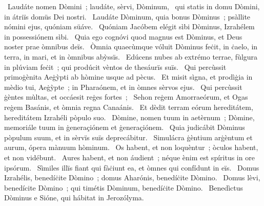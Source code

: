 \psalmChapterWithInscription{}
{ }
{%
~Laudáte nomen Dòmini~; laudáte, sèrvi, Dòminum, 
~qui statis in domu Dòmini, in átriïs domüs Dei nostri. 
~Laudáte Dòminum, quia bonus Dòminus~; psàllite nómini ejus, quóniam süáve. 
~Quóniam Jacóbem elégit sìbi Dòminus, Izrahélem in possessiónem sìbi. 
~Quia ego cognóvi quod magnus est Dòminus, et Deus noster prae òmnibus deïs. 
~Òmnia quaecùmque vóluit Dòminus feċit, in ċaelo, in terra, in mari, et in òmnibus abỳssïs. 
~Edúcens nubes ab extrémo terrae, fùlgura in plúviam feċit~; qui prodúcit vèntos de thesáurïs suïs. 
~Qui percùssit primoġènita Aeġỳpti ab hòmine usque ad pècus. 
~Et misit sìgna, et prodìġia in mèdio tui, Aeġỳpte~; in Pharaónem, et in òmnes sèrvos ejus. 
~Qui percùssit ġèntes mùltas, et occáesit reġes fortes~; 
~Sehon reġem Amorraeórum, et Ogas reġem Basánis, et òmnia regna Canaánis. 
~Et dèdit terram eórum hereditátem, hereditátem Izrahéli pòpulo suo. 
~Dòmine, nomen tuum in aetèrnum~; Dòmine, memoriále tuum in ġeneraçiónem et ġeneraçiónem. 
~Quia judicábit Dòminus pòpulum suum, et in sèrvïs suïs deprecábitur. 
~Simulácra ġèntium arġèntum et aurum, ópera mànuum hòminum. 
~Os habent, et non loquèntur~; òculos habent, et non vidébunt. 
~Aures habent, et non áudient~; néque ènim est spíritus in ore ipsórum. 
~Sìmiles illïs fiant qui fàċiunt ea, et òmnes qui confídunt in eïs. 
~Domus Izrahélis, benedíċite Dòmino~; domus Aharónis, benedíċite Dòmino. 
~Domus lèvi, benedícite Dòmino~; qui timétis Dòminum, benedíċite Dòmino. 
~Benedìctus Dòminus e Sióne, qui hábitat in Jerozólyma. 
}
